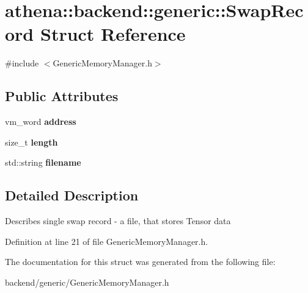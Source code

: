 \hypertarget{structathena_1_1backend_1_1generic_1_1_swap_record}{}\section{athena\+:\+:backend\+:\+:generic\+:\+:Swap\+Record Struct Reference}
\label{structathena_1_1backend_1_1generic_1_1_swap_record}


{\ttfamily \#include $<$Generic\+Memory\+Manager.\+h$>$}

\subsection*{Public Attributes}
\begin{DoxyCompactItemize}
\item 
\mbox{\label{structathena_1_1backend_1_1generic_1_1_swap_record_ac3ffe37973d1992220844a94c8b6afcb}} 
vm\+\_\+word {\bfseries address}
\item 
\mbox{\label{structathena_1_1backend_1_1generic_1_1_swap_record_ad4851011bc4d109f47c5610e817978de}} 
size\+\_\+t {\bfseries length}
\item 
\mbox{\label{structathena_1_1backend_1_1generic_1_1_swap_record_ae3f76aea814f0e9b0d6fabbfa349c54a}} 
std\+::string {\bfseries filename}
\end{DoxyCompactItemize}


\subsection{Detailed Description}
Describes single swap record -\/ a file, that stores Tensor data 

Definition at line 21 of file Generic\+Memory\+Manager.\+h.



The documentation for this struct was generated from the following file\+:\begin{DoxyCompactItemize}
\item 
backend/generic/Generic\+Memory\+Manager.\+h\end{DoxyCompactItemize}
